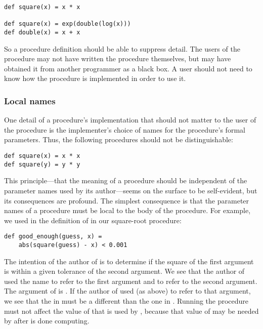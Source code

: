 \begin{lstlisting}
def square(x) = x * x

def square(x) = exp(double(log(x)))
def double(x) = x + x
\end{lstlisting}

So a procedure definition should be able to suppress detail. The users of the procedure may not have written the procedure themselves, but may have obtained it from another programmer as a black box. A user should not need to know how the procedure is implemented in order to use it.

\subsubsection{Local names}

One detail of a procedure's implementation that should not matter to the user of the procedure is the implementer's choice of names for the procedure's formal parameters. Thus, the following procedures should not be distinguishable:

\begin{lstlisting}
def square(x) = x * x
def square(y) = y * y
\end{lstlisting}

This principle---that the meaning of a procedure should be independent of the parameter names used by its author---seems on the surface to be self-evident, but its consequences are profound. The simplest consequence is that the parameter names of a procedure must be local to the body of the procedure. For example, we used  in the definition of  in our square-root procedure:

\begin{lstlisting}
def good_enough(guess, x) =
    abs(square(guess) - x) < 0.001
\end{lstlisting}

The intention of the author of  is to determine if the square of the first argument is within a given tolerance of the second argument. We see that the author of  used the name  to refer to the first argument and  to refer to the second argument. The argument of  is . If the author of  used  (as above) to refer to that argument, we see that the  in  must be a different  than the one in . Running the procedure  must not affect the value of  that is used by , because that value of  may be needed by  after  is done computing.

